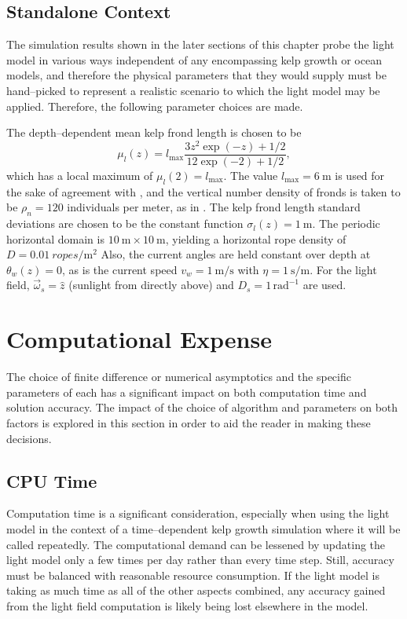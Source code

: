 \subsection{Standalone Context}
\label{sec:standalone_context}
The simulation results shown in the later sections of this chapter probe the light model in various ways independent of any encompassing kelp growth or ocean models, and therefore the physical parameters that they would supply must be hand--picked to represent a realistic scenario to which the light model may be applied.
Therefore, the following parameter choices are made.

The depth--dependent mean kelp frond length is chosen to be
\begin{equation}
    \mu_l(z) = l_{\max}\frac{3z^2 \exp(-z) + 1/2}{12\exp(-2) + 1/2},
\end{equation}
which has a local maximum of $\mu_l(2)=l_{\max}$.
The value $l_{\max}=\SI{6}{\m}$ is used for the sake of agreement with \cite{norvik_design_2017}, and the vertical number density of fronds is taken to be $\rho_n=120$ individuals per meter, as in \cite{broch_modelling_2012}.
The kelp frond length standard deviations are chosen to be the constant function $\sigma_l(z) = \SI{1}{\m}$.
The periodic horizontal domain is $\SI{10}{\m} \times \SI{10}{\m}$, yielding a horizontal rope density of $D=\SI{0.01}{ropes\per\m\squared}$
Also, the current angles are held constant over depth at $\theta_w(z)=0$, as is the current speed $v_w=\SI{1}{\m\per\s}$ with $\eta=\SI{1}{\s\per\m}$.
For the light field, $\vec{\omega}_s=\hat{z}$ (sunlight from directly above) and $D_s=1\, \mbox{rad}^{-1}$ are used.

\section{Computational Expense}
The choice of finite difference or numerical asymptotics and the specific parameters of each has a significant impact on both computation time and solution accuracy.
The impact of the choice of algorithm and parameters on both factors is explored in this section in order to aid the reader in making these decisions.

\subsection{CPU Time}
Computation time is a significant consideration, especially when using the light model in the context of a time--dependent kelp growth simulation where it will be called repeatedly.
The computational demand can be lessened by updating the light model only a few times per day rather than every time step.
Still, accuracy must be balanced with reasonable resource consumption. If the light model is taking as much time as all of the other aspects combined, any accuracy gained from the light field computation is likely being lost elsewhere in the model.

